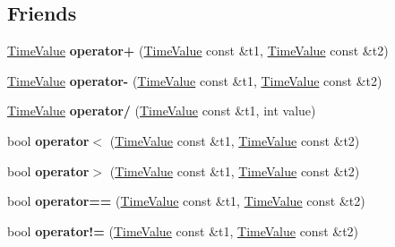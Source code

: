 \subsection*{Friends}
\begin{DoxyCompactItemize}
\item 
\hypertarget{class_common_1_1_time_value_a9679fc995828812a8a942c584d00b2c9}{\hyperlink{class_common_1_1_time_value}{Time\-Value} {\bfseries operator+} (\hyperlink{class_common_1_1_time_value}{Time\-Value} const \&t1, \hyperlink{class_common_1_1_time_value}{Time\-Value} const \&t2)}\label{class_common_1_1_time_value_a9679fc995828812a8a942c584d00b2c9}

\item 
\hypertarget{class_common_1_1_time_value_a9a5c63fd148d5116e11b1335f90e7dfa}{\hyperlink{class_common_1_1_time_value}{Time\-Value} {\bfseries operator-\/} (\hyperlink{class_common_1_1_time_value}{Time\-Value} const \&t1, \hyperlink{class_common_1_1_time_value}{Time\-Value} const \&t2)}\label{class_common_1_1_time_value_a9a5c63fd148d5116e11b1335f90e7dfa}

\item 
\hypertarget{class_common_1_1_time_value_a2c375de762bc38f39e86f89dbdeeafb6}{\hyperlink{class_common_1_1_time_value}{Time\-Value} {\bfseries operator/} (\hyperlink{class_common_1_1_time_value}{Time\-Value} const \&t1, int value)}\label{class_common_1_1_time_value_a2c375de762bc38f39e86f89dbdeeafb6}

\item 
\hypertarget{class_common_1_1_time_value_a4820ed59b33b1e8e812c0641aaf87b34}{bool {\bfseries operator$<$} (\hyperlink{class_common_1_1_time_value}{Time\-Value} const \&t1, \hyperlink{class_common_1_1_time_value}{Time\-Value} const \&t2)}\label{class_common_1_1_time_value_a4820ed59b33b1e8e812c0641aaf87b34}

\item 
\hypertarget{class_common_1_1_time_value_a79a305e78c09826a779f0710a20be056}{bool {\bfseries operator$>$} (\hyperlink{class_common_1_1_time_value}{Time\-Value} const \&t1, \hyperlink{class_common_1_1_time_value}{Time\-Value} const \&t2)}\label{class_common_1_1_time_value_a79a305e78c09826a779f0710a20be056}

\item 
\hypertarget{class_common_1_1_time_value_a1f1fe68e6f7d1ab74e29f59c27bc3865}{bool {\bfseries operator==} (\hyperlink{class_common_1_1_time_value}{Time\-Value} const \&t1, \hyperlink{class_common_1_1_time_value}{Time\-Value} const \&t2)}\label{class_common_1_1_time_value_a1f1fe68e6f7d1ab74e29f59c27bc3865}

\item 
\hypertarget{class_common_1_1_time_value_ab4606325e0becc78ef5746e6ef9d1671}{bool {\bfseries operator!=} (\hyperlink{class_common_1_1_time_value}{Time\-Value} const \&t1, \hyperlink{class_common_1_1_time_value}{Time\-Value} const \&t2)}\label{class_common_1_1_time_value_ab4606325e0becc78ef5746e6ef9d1671}

\end{DoxyCompactItemize}



